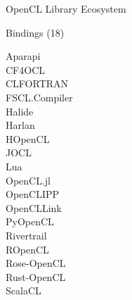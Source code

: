 \begin{frame}{OpenCL Library Ecosystem}

 \begin{minipage}{0.49\textwidth}
 \begin{block}{Bindings (18)}\end{block}
 \begin{minipage}{0.49\textwidth}
Aparapi\\
CF4OCL\\
CLFORTRAN\\
FSCL.Compiler\\
Halide\\
Harlan\\
HOpenCL\\
JOCL\\
Lua\\
OpenCL.jl\\
OpenCLIPP\\
OpenCLLink\\
PyOpenCL\\
Rivertrail\\
ROpenCL\\
Rose-OpenCL\\
Rust-OpenCL\\
ScalaCL\\
 \end{minipage}
  

\end{minipage}
\end{frame}

